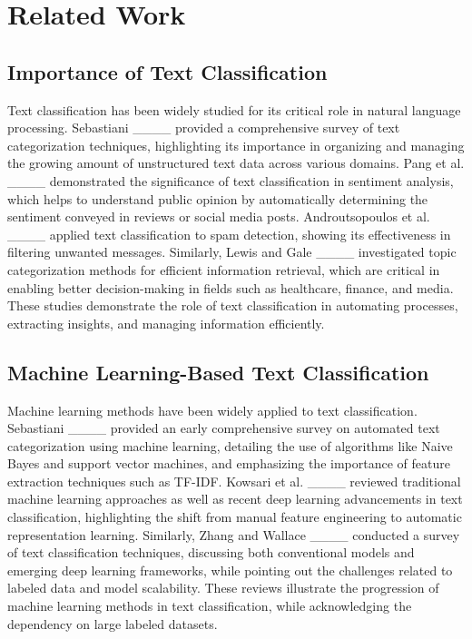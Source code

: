 \section{Related Work}
\subsection{Importance of Text Classification}

Text classification has been widely studied for its critical role in natural language processing. Sebastiani ____ provided a comprehensive survey of text categorization techniques, highlighting its importance in organizing and managing the growing amount of unstructured text data across various domains. Pang et al.  ____ demonstrated the significance of text classification in sentiment analysis, which helps to understand public opinion by automatically determining the sentiment conveyed in reviews or social media posts. Androutsopoulos et al. ____ applied text classification to spam detection, showing its effectiveness in filtering unwanted messages. Similarly, Lewis and Gale ____ investigated topic categorization methods for efficient information retrieval, which are critical in enabling better decision-making in fields such as healthcare, finance, and media. These studies demonstrate the role of text classification in automating processes, extracting insights, and managing information efficiently.

\subsection{Machine Learning-Based Text Classification}

Machine learning methods have been widely applied to text classification. Sebastiani ____ provided an early comprehensive survey on automated text categorization using machine learning, detailing the use of algorithms like Naive Bayes and support vector machines, and emphasizing the importance of feature extraction techniques such as TF-IDF. Kowsari et al. ____ reviewed traditional machine learning approaches as well as recent deep learning advancements in text classification, highlighting the shift from manual feature engineering to automatic representation learning. Similarly, Zhang and Wallace ____ conducted a survey of text classification techniques, discussing both conventional models and emerging deep learning frameworks, while pointing out the challenges related to labeled data and model scalability. These reviews illustrate the progression of machine learning methods in text classification, while acknowledging the dependency on large labeled datasets.

